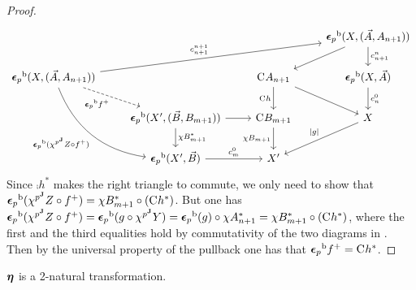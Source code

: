 \documentclass{lmcs} %
\theoremstyle{plain}\newtheorem{satz}[thm]{Satz} %
\begin{document}
\begin{proof}		
	\[\begin{tikzcd}
		&& {} & {\fb{\twont{\epsilon}_p}(X,(\vec{A},A_{n+1}))} \\
		{\fb{\twont{\epsilon}_p}(X,(\vec{A},A_{n+1}))} && {\comp{} A_{n+1}} & {\fb{\twont{\epsilon}_p}(X,\vec{A})} \\
		& {\fb{\twont{\epsilon}_p}(X',(\vec{B}, B_{m+1}))} & {\comp{} B_{m+1}} & X \\
		& {\fb{\twont{\epsilon}_p}(X', \vec{B})} & {X'}
		\arrow[from=1-4, to=2-3]
		\arrow["{\C{n}{n+1}}", from=1-4, to=2-4]
		\arrow["{\C{n+1}{n+1}}", from=2-1, to=1-4]
		\arrow["\fb{\twont{\epsilon}_p}\carr{f}"', dashed, from=2-1, to=3-2]
		\arrow["\fb{\twont{\epsilon}_p}(\JFC{p} Z\arcmp \carr{f})"', bend right, from=2-1, to=4-2]
		\arrow["{\comp{}h}"', from=2-3, to=3-3]
		\arrow[from=2-3, to=3-4]
		\arrow["{\C{0}{n}}", from=2-4, to=3-4]
		\arrow[from=3-2, to=3-3]
		\arrow["\chi B_{m+1}^*", from=3-2, to=4-2]
		\arrow["{\chi B_{m+1}}"', from=3-3, to=4-3]
		\arrow["{\fp{g}}"', from=3-4, to=4-3]
		\arrow["{\C{0}{m}}", from=4-2, to=4-3]
	\end{tikzcd}\]			
	Since $\comp{} h^*$	 makes the right triangle to commute, we only need to show that ${\boldsymbol{\epsilon}_p}^{\mathrm{b}}(\chi^{{p}^{\mathbf{J}}}Z\circ f^+)=\chi B_{m+1}^* \circ (\mathrm{C}^{} h^*)$. But one has ${\boldsymbol{\epsilon}_p}^{\mathrm{b}}(\chi^{{p}^{\mathbf{J}}}Z\circ f^+)={\boldsymbol{\epsilon}_p}^{\mathrm{b}}(g\circ \chi^{{p}^{\mathbf{J}}}Y)={\boldsymbol{\epsilon}_p}^{\mathrm{b}}(g)\circ \chi A_{n+1}^*=\chi B_{m+1}^* \circ (\mathrm{C}^{} h^*)$, where the first and the third equalities hold by commutativity of the two diagrams in . Then by the universal property of the pullback one has that ${\boldsymbol{\epsilon}_p}^{\mathrm{b}}f^+=\mathrm{C}^{} h^*$. 
\end{proof}


\begin{prop}\label{prop:junit}
	$\boldsymbol{\eta}$ is a 2-natural transformation.
\end{prop}
\end{document}
